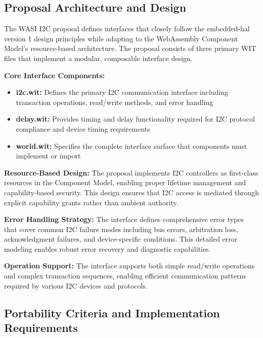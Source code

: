 \subsection{Proposal Architecture and Design}
\label{subsec:i2c-proposal-design}

The WASI I2C proposal defines interfaces that closely follow the embedded-hal version 1 design principles while adapting to the WebAssembly Component Model's resource-based architecture\cite{friedrich_thesis}. The proposal consists of three primary WIT files that implement a modular, composable interface design.

\textbf{Core Interface Components:}
\begin{itemize}
    \item \textbf{i2c.wit:} Defines the primary I2C communication interface including transaction operations, read/write methods, and error handling
    \item \textbf{delay.wit:} Provides timing and delay functionality required for I2C protocol compliance and device timing requirements
    \item \textbf{world.wit:} Specifies the complete interface surface that components must implement or import
\end{itemize}


\textbf{Resource-Based Design:} The proposal implements I2C controllers as first-class resources in the Component Model, enabling proper lifetime management and capability-based security. This design ensures that I2C access is mediated through explicit capability grants rather than ambient authority.

\textbf{Error Handling Strategy:} The interface defines comprehensive error types that cover common I2C failure modes including bus errors, arbitration loss, acknowledgment failures, and device-specific conditions. This detailed error modeling enables robust error recovery and diagnostic capabilities.

\textbf{Operation Support:} The interface supports both simple read/write operations and complex transaction sequences, enabling efficient communication patterns required by various I2C devices and protocols.

\subsection{Portability Criteria and Implementation Requirements}
\label{subsec:i2c-portability}

